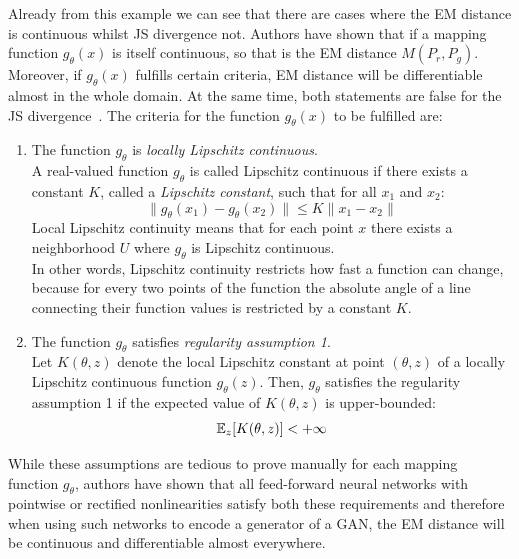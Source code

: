 Already from this example we can see that there are cases where the EM distance is continuous whilst JS divergence not. Authors have shown that if a mapping function $g_\theta(x)$ is itself continuous, so that is the EM distance $M(P_r, P_g)$. Moreover, if $g_\theta(x)$ fulfills certain criteria, EM distance will be differentiable almost in the whole domain. At the same time, both statements are false for the JS divergence~\citep{wgan}. The criteria for the function $g_\theta(x)$ to be fulfilled are:
\begin{enumerate}
	\item The function $g_\theta$ is \textit{locally Lipschitz continuous}. \\
	A real-valued function $g_\theta$ is called Lipschitz continuous if there exists a constant $K$, called a \textit{Lipschitz constant}, such that for all $x_1$ and $x_2$:
	\begin{equation}
		\lVert g_\theta(x_1) - g_\theta(x_2) \lVert \leq K\lVert x_1 - x_2 \lVert
	\end{equation}  
	Local Lipschitz continuity means that for each point $x$ there exists a neighborhood $U$ where $g_\theta$ is Lipschitz continuous. \\
	In other words, Lipschitz continuity restricts how fast a function can change, because for every two points of the function the absolute angle of a line connecting their function values is restricted by a constant $K$. 
	\item The function $g_\theta$ satisfies \textit{regularity assumption 1}. \\
	Let $K(\theta, z)$ denote the local Lipschitz constant at point $(\theta, z)$ of a locally Lipschitz continuous function $g_\theta(z)$. Then, $g_\theta$ satisfies the regularity assumption 1 if the expected value of $K(\theta, z)$ is upper-bounded:
	\begin{equation}
		\operatorname{\mathbb{E}}_z[K(\theta, z)] < +\infty
	\end{equation}
\end{enumerate} 
While these assumptions are tedious to prove manually for each mapping function $g_\theta$, authors have shown that all feed-forward neural networks with pointwise or rectified nonlinearities satisfy both these requirements and therefore when using such networks to encode a  generator of a GAN, the EM distance will be continuous and differentiable almost everywhere.  

